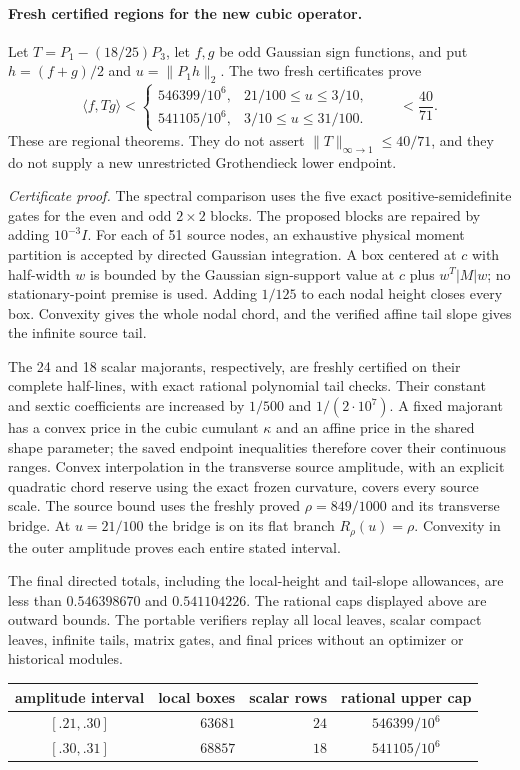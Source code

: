 \paragraph{Fresh certified regions for the new cubic operator.}
Let $T=P_1-(18/25)P_3$, let $f,g$ be odd Gaussian sign functions,
and put $h=(f+g)/2$ and $u=\|P_1h\|_2$. The two fresh certificates prove
\[
 \langle f,Tg\rangle <
 \begin{cases}
  546399/10^6,&21/100\le u\le3/10,\\[2pt]
  541105/10^6,&3/10\le u\le31/100.
 \end{cases}
 \qquad <\frac{40}{71}.
\]
These are regional theorems. They do not assert
$\|T\|_{\infty\to1}\le40/71$, and they do not supply a new
unrestricted Grothendieck lower endpoint.

\emph{Certificate proof.}
The spectral comparison uses the five exact positive-semidefinite gates
for the even and odd $2\times2$ blocks. The proposed blocks are repaired
by adding $10^{-3}I$. For each of 51 source nodes, an exhaustive physical
moment partition is accepted by directed Gaussian integration. A box
centered at $c$ with half-width $w$ is bounded by the Gaussian sign-support
value at $c$ plus $w^T|M|w$; no stationary-point premise is used.
Adding $1/125$ to each nodal height closes every box. Convexity gives the
whole nodal chord, and the verified affine tail slope gives the infinite
source tail.

The 24 and 18 scalar majorants, respectively, are freshly certified on
their complete half-lines, with exact rational polynomial tail checks.
Their constant and sextic coefficients are increased by $1/500$ and
$1/(2\cdot10^7)$. A fixed majorant has a convex price in the cubic
cumulant $\kappa$ and an affine price in the shared shape parameter;
the saved endpoint inequalities therefore cover their continuous ranges.
Convex interpolation in the transverse source amplitude, with an explicit
quadratic chord reserve using the exact frozen curvature, covers every source scale. The source bound uses
the freshly proved $\rho=849/1000$ and its transverse bridge. At
$u=21/100$ the bridge is on its flat branch $R_\rho(u)=\rho$.
Convexity in the outer amplitude proves each entire stated interval.

The final directed totals, including the local-height and tail-slope
allowances, are less than $0.546398670$ and $0.541104226$.
The rational caps displayed above are outward bounds. The portable
verifiers replay all local leaves, scalar compact leaves, infinite tails,
matrix gates, and final prices without an optimizer or historical modules.

\begin{center}
\begin{tabular}{c|r|r|c}
 amplitude interval & local boxes & scalar rows & rational upper cap\\ \hline
 $[.21,.30]$ & $63681$ & $24$ & $546399/10^6$\\
 $[.30,.31]$ & $68857$ & $18$ & $541105/10^6$
\end{tabular}
\end{center}

